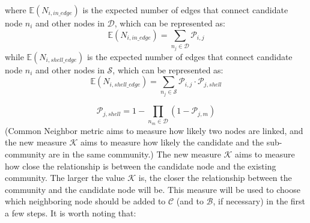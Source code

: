 \documentclass[\main/thesis.tex]{subfiles}
\begin{document}
where $\mathbb{E}(N_{i,in\_edge})$ is the expected number of edges that connect candidate node $n_i$ and other nodes in $\mathcal{D}$, which can be represented as:
\begin{equation}
\mathbb{E}(N_{i,in\_edge}) = \sum_{n_j\in \mathcal{D}}\mathcal{P}_{i,j}
\end{equation}
while $\mathbb{E}(N_{i,shell\_edge})$ is the expected number of edges that connect candidate node $n_i$ and other nodes in $\mathcal{S}$, which can be represented as:
\begin{equation}
\mathbb{E}(N_{i,shell\_edge}) = \sum_{n_j\in \mathcal{S}}\mathcal{P}_{i,j}\cdot \mathcal{P}_{j,shell}
\end{equation}

\begin{equation}
\mathcal{P}_{j,shell} = 1-\prod_{n_m\in \mathcal{D}}(1-\mathcal{P}_{j,m})
\label{update-probability}
\end{equation}
(Common Neighbor metric aims to measure how likely two nodes are linked, and the new measure $\mathcal{K}$ aims to measure how likely the candidate and the sub-community are in the same community.)
The new measure $\mathcal{K}$ aims to measure how close the relationship is between the candidate node and the existing community. The larger the value $\mathcal{K}$ is, the closer the relationship between the community and the candidate node will be. This measure will be used to choose which neighboring node should be added to $\mathcal{C}$ (and to $\mathcal{B}$, if necessary) in the first a few steps. 
It is worth noting that:
\end{document}
